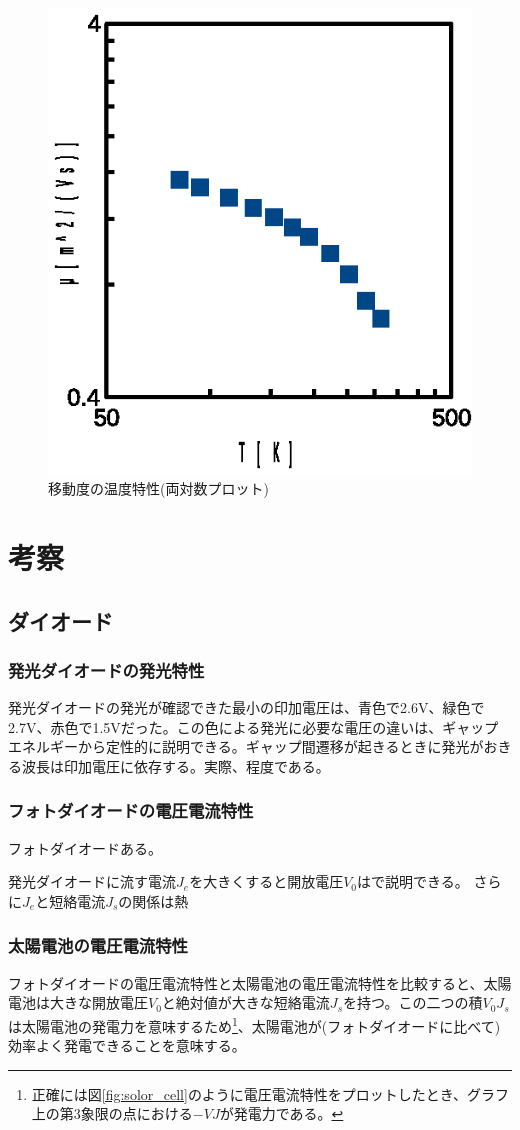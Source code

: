 \documentclass[11pt,a4]{jarticle}
\begin{document}
 \begin{figure}[!htbp]
   \begin{center}
    \includegraphics[width=0.4\hsize]{./T_mu_log.eps}
    \caption{移動度の温度特性(両対数プロット)}
     \label{fig:T_mu_log}
   \end{center}
\end{figure}

\section{考察}
\subsection{ダイオード}
\subsubsection{発光ダイオードの発光特性}
発光ダイオードの発光が確認できた最小の印加電圧は、青色で2.6V、緑色で2.7V、赤色で1.5Vだった。この色による発光に必要な電圧の違いは、ギャップエネルギーから定性的に説明できる。ギャップ間遷移が起きるときに発光がおきる波長は印加電圧に依存する。実際、程度である。
\subsubsection{フォトダイオードの電圧電流特性}
フォトダイオードある。

発光ダイオードに流す電流$J_e$を大きくすると開放電圧$V_0$はで説明できる。
さらに$J_e$と短絡電流$J_s$の関係は熱
\subsubsection{太陽電池の電圧電流特性}
フォトダイオードの電圧電流特性と太陽電池の電圧電流特性を比較すると、太陽電池は大きな開放電圧$V_0$と絶対値が大きな短絡電流$J_s$を持つ。この二つの積$V_0J_s$は太陽電池の発電力を意味するため\footnote{正確には図\ref{fig:solor_cell}のように電圧電流特性をプロットしたとき、グラフ上の第3象限の点における$-VJ$が発電力である。}、太陽電池が(フォトダイオードに比べて)効率よく発電できることを意味する。
\end{document}
